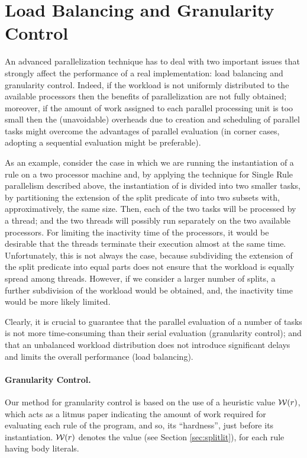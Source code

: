 \documentclass[preprint]{tlp}
\newcommand{\w}[1]{\ensuremath{{\cal W}(#1)}\xspace }
\begin{document}
\section{Load Balancing and Granularity Control} \label{sec:loadB}
An advanced parallelization technique has to deal with two important issues that
strongly affect the performance of a real implementation: load balancing and granularity control.
Indeed, if the workload is not uniformly distributed to the available processors
then the benefits of parallelization are not fully obtained; moreover, if the
amount of work assigned to each parallel processing unit is too small then
the (unavoidable) overheads due to creation and scheduling of parallel tasks
might overcome the advantages of parallel evaluation (in corner cases, adopting
a sequential evaluation might be preferable).

As an example, consider the case in which we are running the instantiation of a rule  on a two
processor machine and,
 by applying the technique for Single Rule parallelism described above,
 the instantiation of  is divided into two smaller tasks, by partitioning
 the extension of the split predicate of  into two subsets with,
 approximatively, the same size.
Then, each of the two tasks will be processed by a thread; and the two
threads will possibly run separately on the two available
processors. For limiting the inactivity time of the processors, it
would be desirable that the threads terminate their execution almost
at the same time. Unfortunately, this is not always the
case, because subdividing the extension of the split predicate into
equal parts does not ensure that the workload is equally spread
among threads. However, if we consider a larger number of splits,
a further subdivision of the workload would be obtained, and, the inactivity
time would be more likely limited.

Clearly, it is crucial to guarantee that the parallel evaluation of a number of tasks
is not more time-consuming than their serial evaluation (granularity control); and that
an unbalanced workload distribution does not introduce
significant delays and limits the overall performance (load balancing).

\paragraph{Granularity Control.}
Our method for granularity control is based on the use of a heuristic value \w{r},
which acts as a litmus paper indicating the amount of work required for evaluating each rule of the program,
and so, its ``hardness'', just before its instantiation.
\w{r} denotes the value  (see Section \ref{sec:splitlit}), for each rule  having  body literals.
\end{document}
